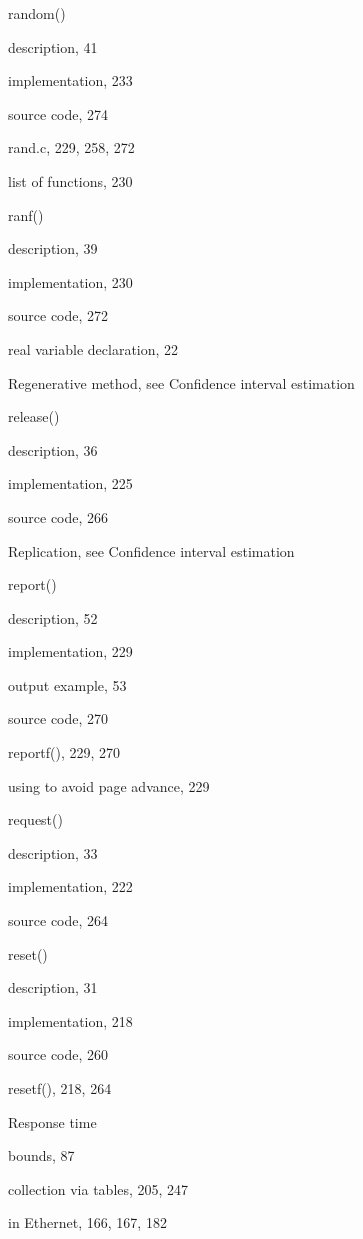 \noindent random()\par
\quad description, 41\par
\quad implementation, 233\par
\quad source code, 274\par
\noindent rand.c, 229, 258, 272\par
\quad list of functions, 230\par
\noindent ranf()\par
\quad description, 39\par
\quad implementation, 230\par
\quad source code, 272\par
\noindent real variable declaration, 22\par
\noindent Regenerative method, see Confidence interval estimation\par
\noindent release()\par
\quad description, 36\par
\quad implementation, 225\par
\quad source code, 266\par
\noindent Replication, see Confidence interval estimation\par
\noindent report()\par
\quad description, 52\par
\quad implementation, 229\par
\quad output example, 53\par
\quad source code, 270\par
\noindent reportf(), 229, 270\par
\quad using to avoid page advance, 229\par
\noindent request()\par
\quad description, 33\par
\quad implementation, 222\par
\quad source code, 264\par
\noindent reset()\par
\quad description, 31\par
\quad implementation, 218\par
\quad source code, 260\par
\noindent resetf(), 218, 264\par
\noindent Response time\par
\quad bounds, 87\par
\quad collection via tables, 205, 247\par
\quad in Ethernet, 166, 167, 182\par
